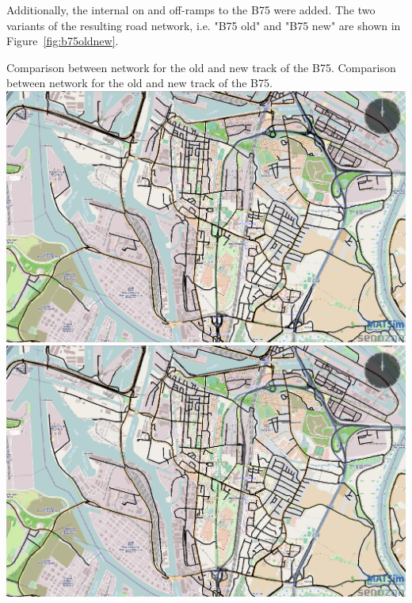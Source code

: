 Additionally, the internal on and off-ramps to the B75 were added. The two variants of the resulting road network, i.e. "B75 old" and "B75 new" are shown in Figure~\ref{fig:b75oldnew}.



\createfigure%
{Comparison between network for the old and new track of the B75.}%
{Comparison between network for the old and new track of the B75.}%
{\label{fig:b75oldnew}}%
{%
  \createsubfigure%
  {}%
  {\includegraphics[width=.475\linewidth]{using/figures/B75old}}%
  {}%
  {}%
  \createsubfigure%
  {}%
  {\includegraphics[width=.475\linewidth]{using/figures/B75new}}
  {}%
  {}%
}%
  {}%


